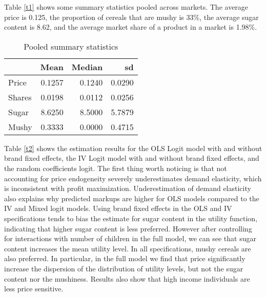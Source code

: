 \documentclass[12pt,english]{article}
\begin{document}
\begin{enumerate}
Table \eqref{t1} shows some summary statistics pooled across markets. The average price is 0.125, the proportion of cereals that are mushy is 33\%, the average sugar content is 8.62, and the average market share of a product in a market is 1.98\%.


\begin{table}[H]
  \centering
  \caption{Pooled summary statistics}
    \begin{tabular}{lrrr}
    \hline
          & Mean  & Median & sd \\
          \hline
    Price & 0.1257 & 0.1240 & 0.0290 \\
    Shares & 0.0198 & 0.0112 & 0.0256 \\
    Sugar & 8.6250 & 8.5000 & 5.7879 \\
    Mushy & 0.3333 & 0.0000 & 0.4715 \\
    \hline
    \end{tabular}%
  \label{t1}%
\end{table}

Table \eqref{t2} shows the estimation results for the OLS Logit model with and without brand fixed effects, the IV Logit model with and without brand fixed effects, and the random coefficients logit. The first thing worth noticing is that not accounting for price endogeneity severely underestimates demand elasticity, which is inconsistent with profit maximization. Underestimation of demand elasticity also explains why predicted markups are higher for OLS models compared to the IV and Mixed logit models. Using brand fixed effects in the OLS and IV specifications tends to bias the estimate for sugar content in the utility function, indicating that higher sugar content is less preferred. However after controlling for interactions with number of children in the full model, we can see that sugar content increases the mean utility level. In all specifications, mushy cereals are also preferred. In particular, in the full model we find that price significantly increase the dispersion of the distribution of utility levels, but not the sugar content nor the mushiness. Results also show that high income individuals are less price sensitive. 



\end{enumerate}
\end{document}
